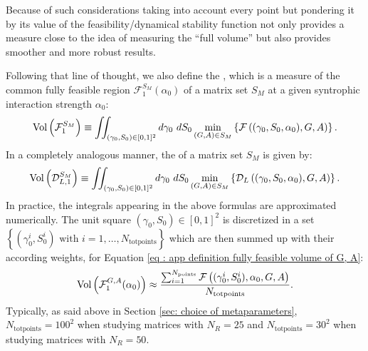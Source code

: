 \documentclass[12pt, titlepage, twoside, openright]{report}
\begin{document}
Because of such considerations taking into account every point but pondering it by its value of the feasibility/dynamical stability function not only provides a measure close to the idea of measuring the ``full volume'' but also provides smoother and more robust results.

Following that line of thought, we also define the , which is a measure of the common fully feasible region $\mathcal{F}_1^{S_M}(\alpha_0)$ of a matrix set $S_M$ at a given syntrophic interaction strength $\alpha_0$:
\begin{equation}
\text{Vol}\left(\mathcal{F}_1^{S_M}\right) \equiv \iint_{(\gamma_0, S_0) \in [0,1]^2} d\gamma_0 \ dS_0 \min_{(G,A)\in S_M} \left\{\mathcal{F}\left((\gamma_0, S_0, \alpha_0), G, A\right)\right\}.
\end{equation}
In a completely analogous manner, the  of a matrix set $S_M$ is given by:
\begin{equation}
\text{Vol}\left(\mathcal{D}_{L,1}^{S_M}\right) \equiv \iint_{(\gamma_0, S_0) \in [0,1]^2} d\gamma_0 \ dS_0 \min_{(G,A)\in S_M} \left\{\mathcal{D}_{L}\left((\gamma_0, S_0, \alpha_0), G, A\right)\right\}.
\end{equation}
In practice, the integrals appearing in the above formulas are approximated numerically. The unit square $(\gamma_0, S_0) \in [0,1]^2$ is discretized in a set $\left\{(\gamma_0^i, S_0^{i})\text{ with } i=1, \dots, N_\text{totpoints}\right\}$ which are then summed up with their according weights, \eg for Equation \eqref{eq : app definition fully feasible volume of G, A}:
\begin{equation}
\text{Vol}\left(\mathcal{F}_1^{G,A}(\alpha_0)\right) \approx \frac{\sum_{i=1}^{N_\text{points}}\mathcal{F}\left((\gamma_0^{i}, S_0^{i}), \alpha_0, G, A\right)}{N_\text{totpoints}}.
\end{equation}
Typically, as said above in Section \ref{sec: choice of metaparameters}, $N_\text{totpoints}=100^2$ when studying matrices with $N_R=25$ and $N_\text{totpoints}=30^2$ when studying matrices with $N_R=50$.
\end{document}
